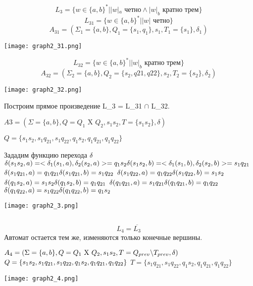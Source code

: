 \documentclass[a4paper, 12pt]{article}
\begin{document}
\subsection{}
$$L_3 = \{ w \in \{a,b\}^* | |w|_a \text{ четно} \land |w|_b \text{ кратно трем} \}$$
$$L_{31} = \{ w \in \{a,b\}^* | |w| \text{ четно} \}$$
$$A_{31} = (\Sigma_1 = \{a, b\}, Q_1 = \{s_1, q_1\}, s_1, T_1 = \{s_1\}, \delta_1)$$
\begin{center}
    \texttt{[image: graph2\_31.png]}
\end{center}

$$L_{32} = \{ w \in \{a,b\}^* | |w|_b \text{ кратно трем} \}$$
$$A_{32} = (\Sigma_2 = \{a, b\}, Q_2 = \{s_2, q21, q22\}, s_2, T_2 = \{s_2\}, \delta_2)$$
\begin{center}
    \texttt{[image: graph2\_32.png]}
\end{center}
Построим прямое произведение L_3 = L_{31} $\cap$ L_{32}.

$A3 = (\Sigma = \{a, b\}, Q = Q_1 \text{ X } Q_2, s_1s_2, T = \{s_1s_2\}, \delta)$

$Q = \{s_1s_2, s_1q_{21}, s_1q_{22}, q_1s_2, q_1q_{21}, q_1q_{22}\}$

Зададим функцию перехода $\delta\\$
\nointend
$\delta(s_1s_2, a) = <\delta_1(s_1, a), \delta_2(s_2, a)> = q_1s_2 \hfill \delta(s_1s_2, b) = <\delta_1(s_1, b), \delta_2(s_2, b)> = s_1q_{21}\\$
$\delta(s_1q_{21}, a) =  q_1q_{21}\hfill \delta(s_1q_{21}, b) = s_1q_{22}\\$
$\delta(s_1q_{22}, a) =  q_1q_{22}\hfill \delta(s_1q_{22}, b) = s_1s_2\\$
$\delta(q_1s_2, a) =  s_1s_2\hfill \delta(q_1s_2, b) = q_1q_{21}\\$
$\delta(q_1q_{21}, a) =  s_1q_{21}\hfill \delta(q_1q_{21}, b) = q_1q_{22}\\$
$\delta(q_1q_{22}, a) =  s_1q_{22}\hfill \delta(q_1q_{22}, b) = q_1s_2\\$

\texttt{[image: graph2\_3.png]}

\subsection{}
$$L_4 = \overline{L_3}$$
Автомат остается тем же, изменяются только конечные вершины.


$A_4 = (\Sigma = \{a, b\}, Q = Q_1 \text{ X } Q_2, s_1s_2, T = Q_{prev} \backslash T_{prev}, \delta)\\$
$Q = \{s_1s_2, s_1q_{21}, s_1q_{22}, q_1s_2, q_1q_{21}, q_1q_{22}\}\\$
$T = \{ s_1q_{21}, s_1q_{22}, q_1s_2, q_1q_{21}, q_1q_{22}\}$
\begin{center}
    \texttt{[image: graph2\_4.png]}
\end{center}
\end{document}
